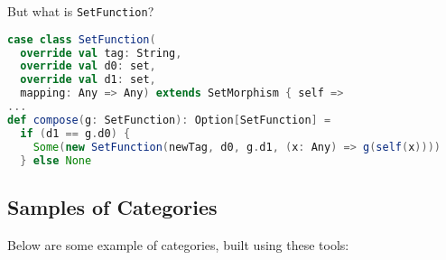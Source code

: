 \documentclass[10pt]{asme2ej}
\begin{document}
But what is \verb+SetFunction+?

\begin{lstlisting}[language=Scala]
case class SetFunction(
  override val tag: String,
  override val d0: set,
  override val d1: set,
  mapping: Any => Any) extends SetMorphism { self =>
...
def compose(g: SetFunction): Option[SetFunction] =
  if (d1 == g.d0) {
    Some(new SetFunction(newTag, d0, g.d1, (x: Any) => g(self(x))))
  } else None
\end{lstlisting}

\subsection{Samples of Categories}
Below are some example of categories, built using these tools:

\FloatBarrier
\end{document}
